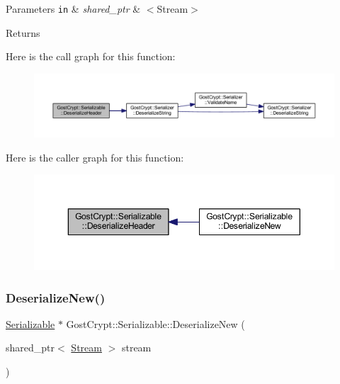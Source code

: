 \begin{DoxyParams}[1]{Parameters}
\mbox{\tt in}  & {\em shared\+\_\+ptr} & $<$\+Stream$>$ \\
\hline
\end{DoxyParams}
\begin{DoxyReturn}{Returns}

\end{DoxyReturn}
Here is the call graph for this function\+:
\nopagebreak
\begin{figure}[H]
\begin{center}
\leavevmode
\includegraphics[width=350pt]{class_gost_crypt_1_1_serializable_a7f36a9d2ec09e05dee375b802fa13ab1_cgraph}
\end{center}
\end{figure}
Here is the caller graph for this function\+:
\nopagebreak
\begin{figure}[H]
\begin{center}
\leavevmode
\includegraphics[width=350pt]{class_gost_crypt_1_1_serializable_a7f36a9d2ec09e05dee375b802fa13ab1_icgraph}
\end{center}
\end{figure}
\mbox{\label{class_gost_crypt_1_1_serializable_a2a1a45654e086d8b894d027bb781627a}} 
\subsubsection{\texorpdfstring{Deserialize\+New()}{DeserializeNew()}}
{\footnotesize\ttfamily \hyperlink{class_gost_crypt_1_1_serializable}{Serializable} $\ast$ Gost\+Crypt\+::\+Serializable\+::\+Deserialize\+New (\begin{DoxyParamCaption}\item[{shared\+\_\+ptr$<$ \hyperlink{class_gost_crypt_1_1_stream}{Stream} $>$}]{stream }\end{DoxyParamCaption})\hspace{0.3cm}{\ttfamily [static]}}


